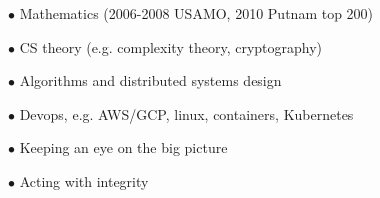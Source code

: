 \documentclass[11 pt]{article}
\begin{document}
$\bullet$ Mathematics (2006-2008 USAMO, 2010 Putnam top 200)

$\bullet$ CS theory (e.g. complexity theory, cryptography) %

$\bullet$ Algorithms and distributed systems design

$\bullet$ Devops, e.g. AWS/GCP, linux, containers, Kubernetes %


$\bullet$ Keeping an eye on the big picture

$\bullet$ Acting with integrity




\end{document}
